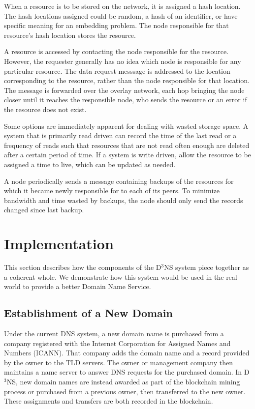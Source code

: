 When a resource is to be stored on the network, it is assigned a hash location. The hash locations assigned could be random, a hash of an identifier, or have specific meaning for an embedding problem. The node responsible for that resource's hash location stores the resource.

A resource is accessed by contacting the node responsible for the resource.  However, the requester generally has no idea which node is responsible for any particular resource.  The data request messsage is addressed to the location corresponding to the resource, rather than the node responsible for that location.  The message is forwarded over the overlay network, each hop bringing the node closer until it reaches the responsible node, who sends the resource or an error if the resource does not exist.

Some options are immediately apparent for dealing with wasted storage space. A system that is primarily read driven can record the time of the last read or a frequency of reads such that resources that are not read often enough are deleted after a certain period of time. If a system is write driven, allow the resource to be assigned a time to live, which can be updated as needed.

A node periodically sends a message containing backups of the resources for which it became newly responsible for to each of its peers. To minimize bandwidth and time wasted by backups, the node should only send the records changed since last backup.



\section{Implementation}
This section describes how the components of the D$^3$NS system piece together as a coherent whole.  We demonstrate how this system would be used in the real world to provide a better Domain Name Service.


\subsection{Establishment of a New Domain}
Under the current DNS system, a new domain name is purchased from a company registered with the Internet Corporation for Assigned Names and Numbers (ICANN). That company adds the domain name and a record provided by the owner to the TLD servers. The owner or management company then maintains a name server to answer DNS requests for the purchased domain. In D$^{3}$NS, new domain names are instead awarded as part of the blockchain mining process or purchased from a previous owner, then transferred to the new owner. These assignments and transfers are both recorded in the blockchain. 


